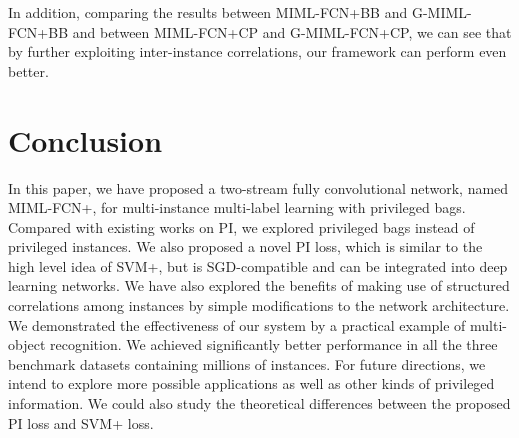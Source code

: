 \documentclass[10pt,twocolumn,letterpaper]{article}
\begin{document}
In addition, comparing the results between MIML-FCN+BB and
G-MIML-FCN+BB and between MIML-FCN+CP and G-MIML-FCN+CP, we can
see that by further exploiting inter-instance correlations, our
framework can perform even better.



\section{Conclusion}
In this paper, we have proposed a two-stream fully convolutional
network, named MIML-FCN+, for multi-instance multi-label learning
with privileged bags. Compared with existing works on PI, we
explored privileged bags instead of privileged instances. We also
proposed a novel PI loss, which is similar to the high level idea
of SVM+, but is SGD-compatible and can be integrated into deep
learning networks. We have also explored the benefits of making
use of structured correlations among instances by simple
modifications to the network architecture. We demonstrated the
effectiveness of our system by a practical example of multi-object
recognition. We achieved significantly better performance in all
the three benchmark datasets containing millions of instances. For future directions, we intend to explore more possible applications
as well as other kinds of privileged information. We could also study the theoretical differences between the proposed PI loss and SVM+ loss.

{\small
	
	
}
\end{document}
